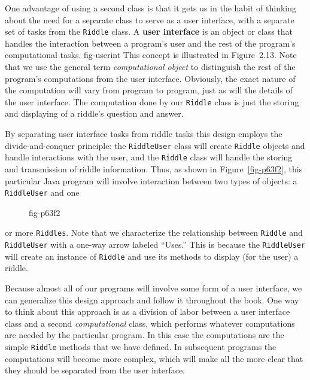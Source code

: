 One advantage of using a second class is that it gets us in the
 habit of thinking about the need for a separate class to serve as a
user interface, with a separate set of tasks from the {\tt Riddle}
class. A {\bf user interface} is an object or class that handles the
interaction between a program's user and the rest of the program's
computational tasks.
{fig-userint}
 This concept is illustrated in Figure~2.13. Note
that we use the general term {\it computational object} to distinguish
the rest of the program's computations from the user interface.
Obviously, the exact nature of the computation will vary from program
to program, just as will the details of the user interface.  The
computation done by our {\tt Riddle} class is just the storing and
displaying of a riddle's question and answer.


By separating user interface tasks from riddle tasks this design
employs the divide-and-conquer principle: the {\tt RiddleUser} class
will create {\tt Riddle} objects and handle interactions with the
user, and the {\tt Riddle} class will handle the storing and
transmission of riddle information.  Thus, as shown in
Figure~\ref{fig-p63f2}, this particular Java program will involve
interaction between two types of objects: a {\tt RiddleUser} and one
\begin{figure}[h!]
\figaleft{chptr02/riddleuser-smaller.png}{This UML class diagram represents an {\em association}
between the {\tt RiddleUser} and {\tt Riddle} classes.  The {\tt
Riddle\-User} class will {\em use} one or more objects of the {\tt
Riddle} class.
} {fig-p63f2}

\end{figure}
or more {\tt Riddles}. Note that we characterize the relationship
between {\tt Riddle} and {\tt RiddleUser} with a one-way arrow labeled
``Uses.''  This is because the {\tt RiddleUser} will create an
instance of {\tt Riddle} and use its methods to display (for the user)
a riddle.

Because almost all of our programs will involve some form of a user
interface, we can generalize this design approach and follow it
throughout the book. One way to think about this approach is as a
division of labor between a user interface class and a second {\em
computational} class, which performs whatever computations are needed
by the particular program. In this case the computations are the simple
{\tt Riddle} methods that we have defined. In subsequent programs the
computations will become more complex, which will make all the more
clear that they should be separated from the user interface.
 

